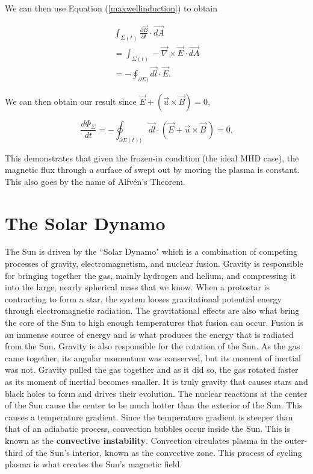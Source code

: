 \documentclass[%
 reprint,
 amsmath,amssymb,
 aps,
]{revtex4-1}
\begin{document}
We can then use Equation (\ref{maxwellinduction}) to obtain

\begin{equation}
\begin{multlined}
\int_{\Sigma (t)} \frac{\partial \vec{B}}{\partial t} \cdot \vec{dA}
\\ = \int_{\Sigma (t)} - \vec{\nabla} \times \vec{E} \cdot \vec{dA}
\\ = - \oint _{\partial \Sigma)} \vec{dl} \cdot \vec{E}.
\end{multlined}
\end{equation}

We can then obtain our result since $\vec{E} + (\vec{u} \times \vec{B}) = 0$,

\begin{equation}
\frac{d \Phi_{\Sigma}}{d t} = - \oint _{\partial \Sigma(t))} \vec{dl} \cdot (\vec{E} + \vec{u} \times \vec{B} \, ) = 0.
\end{equation}

This demonstrates that given the frozen-in condition (the ideal MHD case), the magnetic flux through a surface of swept out by moving the plasma is constant. This also goes by the name of Alfvén's Theorem.


\section{The Solar Dynamo}


The Sun is driven by the ``Solar Dynamo" which is a combination of competing processes of gravity, electromagnetism, and nuclear fusion. Gravity is responsible for bringing together the gas, mainly hydrogen and helium, and compressing it into the large, nearly spherical mass that we know. When a protostar is contracting to form a star, the system looses gravitational potential energy through electromagnetic radiation. The gravitational effects are also what bring the core of the Sun to high enough temperatures that fusion can occur. Fusion is an immense source of energy and is what produces the energy that is radiated from the Sun. Gravity is also responsible for the rotation of the Sun. As the gas came together, its angular momentum was conserved, but its moment of inertial was not. Gravity pulled the gas together and as it did so, the gas rotated faster as its moment of inertial becomes smaller. It is truly gravity that causes stars and black holes to form and drives their evolution. The nuclear reactions at the center of the Sun cause the center to be much hotter than the exterior of the Sun. This causes a temperature gradient. Since the temperature gradient is steeper than that of an adiabatic process, convection bubbles occur inside the Sun. This is known as the \textbf{convective instability}. Convection circulates plasma in the outer-third of the Sun's interior, known as the convective zone. This process of cycling plasma is what creates the Sun's magnetic field. 
\end{document}

